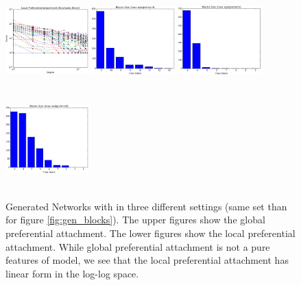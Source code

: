 \begin{figure}[h]
	\includegraphics[width=3.2cm, height=3.7cm]{img/M_g_regular/figure_3}
	\endminipage
		\vspace{-0.4cm}
	\includegraphics[width=3.2cm, height=3.7cm]{img/M_g_peaks/figure_5}
	\endminipage
	\includegraphics[width=3.2cm, height=3.7cm]{img/M_g_power_law/figure_5} 
	\endminipage
	\includegraphics[width=3.2cm, height=3.7cm]{img/M_g_regular/figure_5}
	\endminipage
	\caption{Generated Networks with in three different settings (same set than for figure \ref{fig:gen_blocks}). The upper figures show the global preferential attachment. The lower figures show the local preferential attachment. While global preferential attachment is not a pure features of model, we see that the local preferential attachment has linear form in the log-log space.}
	\label{fig:gen_burst_mmsb}
\end{figure}



